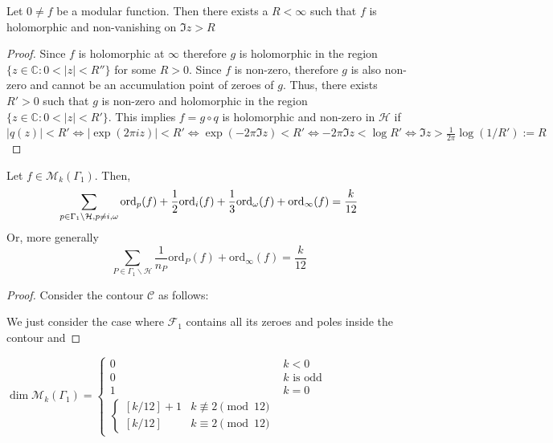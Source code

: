 \documentclass[oneside, 12pt]{scrbook}
\newcommand{\CC}{\mathbb C}
\newcommand{\ord}{\mathrm{ord}}
\newcommand{\bs}{\backslash}
\newcommand{\Hh}{\mathcal{H}}
\newcommand{\Mm}{\mathcal{M}}
\theoremstyle{theorem}
\begin{document}
\begin{lemma}
Let $0 \neq f$ be a modular function. Then there exists a $R < \infty$ such that $f$ is holomorphic and non-vanishing on $\mathfrak{I}z >R$
\end{lemma}

\begin{proof}
Since $f$ is holomorphic at $\infty$ therefore $g$ is holomorphic in the region $\{z \in \CC : 0 < |z| < R''\}$ for some $R>0$. Since $f$ is non-zero, therefore $g$ is also non-zero and cannot be an accumulation point of zeroes of $g$. Thus, there exists $R' >0$ such that $g$ is non-zero and holomorphic in the region $\{z \in \CC : 0 < |z| < R'\}$. This implies $f = g \circ q$ is holomorphic and non-zero in $\Hh$ if $|q(z)| < R' \Leftrightarrow |\exp(2\pi i z)| < R' \Leftrightarrow \exp(-2\pi \mathfrak{I}z) < R' \Leftrightarrow -2\pi \mathfrak{I}z < \log R' \Leftrightarrow \mathfrak{I}z > \frac{1}{2\pi} \log(1/R'):=R$
\end{proof}

\begin{proposition}
Let $f \in \Mm_{k}(\Gamma_{1})$. Then, $$\sum_{p \in \Gamma_{1}\backslash \Hh,\\ p\neq i,\omega}\mathrm{ord}_{p}(f) +  \frac{1}{2} \ord_{i}(f) + \frac{1}{3} \ord_{\omega}(f) + \mathrm{ord}_{\infty}(f) = \frac{k}{12}$$
Or, more generally $$\sum_{P \in \Gamma_{1}\bs \Hh} \frac{1}{n_{P}} \ord_{P}(f) + \ord_{\infty}(f) = \frac{k}{12}$$
\end{proposition}

\begin{proof}
Consider the contour $\mathcal{C}$ as follows: 

We just consider the case where $\mathcal{F}_{1}$ contains all its zeroes and poles inside the contour and 
\end{proof}

\begin{corollary}
$\dim \Mm_{k}(\Gamma_{1}) = \begin{cases} 0 & k < 0 \\ 0 & k \text{ is odd } \\ 1 & k=0 \\ \begin{cases}[k/12]+1 & k\not \equiv 2\pmod{12} \\ [k/12] & k \equiv 2\pmod{12} \end{cases} \end{cases}$
\end{corollary}
\end{document}
